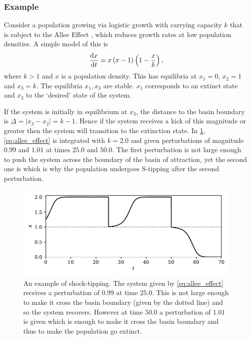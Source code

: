 \subsubsection{Example}
Consider a population growing via logistic growth with carrying capacity $k$ that is subject to the Allee Effect \parencite{Allee1932,Stephens1999}, which reduces growth rates
at low population densities. A simple model of this is
\begin{equation}
  \label{eq:allee_effect}
  \dv{x}{t} = x\left(x-1\right)\left(1-\frac{x}{k}\right),
\end{equation}
where $k > 1$ and $x$ is a population density. This has equilibria at $x_1 = 0$, $x_2 = 1$ and $x_3 = k$. The equilibria $x_1,x_3$ are stable. $x_1$ corresponds to an extinct
state and $x_3$ to the `desired' state of the system.

If the system is initially in equilibrium at $x_3$, the distance to the basin boundary is $\Delta = |x_3 - x_2| = k - 1$. Hence if the system receives a kick of
this magnitude or greater then the system will transition to the extinction state. In \cref{fig:shock_tipping}, \cref{eq:allee_effect} is integrated with $k = 2.0$ and given perturbations of
magnitude $0.99$ and $1.01$ at times $25.0$ and $50.0$. The first perturbation is not large enough to push the system across the boundary of the basin of attraction, yet the second one is
which is why the population undergoes S-tipping after the second perturbation.

\begin{figure}
  \centering
  \includegraphics{shock}
  \caption{An example of shock-tipping. The system given by \cref{eq:allee_effect} receives a perturbation of $0.99$ at time $25.0$. This is not large enough to make it cross the basin boundary
    (given by the dotted line) and so the system recovers. However at time $50.0$ a perturbation of $1.01$ is given which is enough to make it cross the basin boundary and thus to make the
  population go extinct.}
  \label{fig:shock_tipping}
\end{figure}

